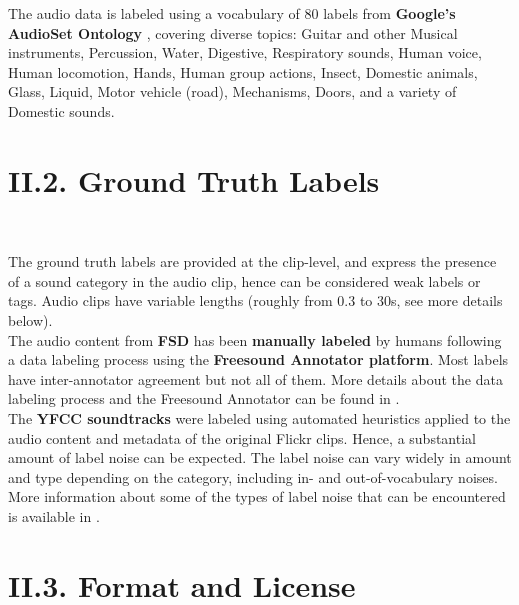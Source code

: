 \documentclass[11pt, a4papper]{report}
\theoremstyle{plain}
\theoremstyle{definition}
\theoremstyle{definition}
\theoremstyle{proposition}
\begin{document}
The audio data is labeled using a vocabulary of 80 labels from \textbf{Google’s AudioSet Ontology} \cite{2}, covering diverse topics: Guitar and other Musical instruments, Percussion, Water, Digestive, Respiratory sounds, Human voice, Human locomotion, Hands, Human group actions, Insect, Domestic animals, Glass, Liquid, Motor vehicle (road), Mechanisms, Doors, and a variety of Domestic sounds. 


\section*{II.2. Ground Truth Labels}
\

The ground truth labels are provided at the clip-level, and express the presence of a sound category in the audio clip, hence can be considered weak labels or tags. Audio clips have variable lengths (roughly from 0.3 to 30s, see more details below).
\\

The audio content from \textbf{FSD} has been \textbf{manually labeled} by humans following a data labeling process using the \textbf{Freesound Annotator platform}. Most labels have inter-annotator agreement but not all of them. More details about the data labeling process and the Freesound Annotator can be found in \cite{3}.
\\

The \textbf{YFCC soundtracks} were labeled using automated heuristics applied to the audio content and metadata of the original Flickr clips. Hence, a substantial amount of label noise can be expected. The label noise can vary widely in amount and type depending on the category, including in- and out-of-vocabulary noises. More information about some of the types of label noise that can be encountered is available in \cite{4}.


\section*{II.3. Format and License}
\
\end{document}
